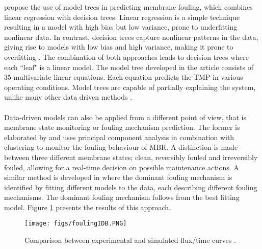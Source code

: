 \cite{Dalmau2015} propose the use of model trees in predicting membrane fouling, which combines linear regression with decision trees. Linear regression is a simple technique resulting in a model with high bias but low variance, prone to underfitting nonlinear data. In contrast, decision trees capture nonlinear patterns in the data, giving rise to models with low bias and high variance, making it prone to overfitting \citep{Dalmau2015}. The combination of both approaches leads to decision trees where each ``leaf" is a linear model. The model tree developed in the article consists of 35 multivariate linear equations. Each equation predicts the \gls{TMP} in various operating conditions. Model trees are capable of partially explaining the system, unlike many other data driven methods \citep{Dalmau2015}. \\ \\
Data-driven models can also be applied from a different point of view, that is membrane state monitoring or fouling mechanism prediction. The former is elaborated by \cite{Maere2012} and uses principal component analysis in combination with clustering to monitor the fouling behaviour of \gls{MBR}. A distinction is made between three different membrane states; clean, reversibly fouled and irreversibly fouled, allowing for a real-time decision on possible maintenance actions. A similar method is developed in \cite{Drews2009} where the dominant fouling mechanism is identified by fitting  different models to the data, each describing different fouling mechanisms. The dominant fouling mechanism follows from the best fitting model. Figure \ref{foulingID} presents the results of this approach. 

\begin{figure}[H]
\begin{center}
\hspace{-1.5cm}
\texttt{[image: figs/foulingIDB.PNG]}
\caption{Comparison between experimental and simulated  flux/time curves \citep{Drews2009}.\label{foulingID}}
\end{center}
\end{figure}

